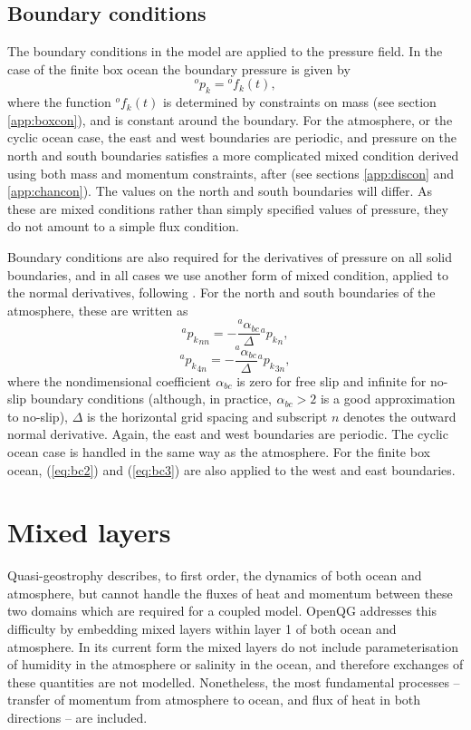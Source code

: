 \documentclass[11pt, a4paper,twoside]{article}
\newcommand{\p}[2]{{{}^{#1}p_{#2}}}
\newcommand{\f}[2]{{{}^{#1}f_{#2}}}
\newcommand{\alphbc}[1]{{}^{#1}\alpha_{bc}}
\numberwithin{equation}{section}
\begin{document}
\subsection{Boundary conditions}
The boundary conditions in the model are applied to the pressure field.
In the case of the finite box ocean the boundary pressure is given by
\begin{equation}\label{eq:bc1}
\p{o}{k} = \f{o}{k}(t),
\end{equation}
where the function $\f{o}{k}(t)$ is determined by constraints on mass
(see section \ref{app:boxcon}), and is constant around the boundary. 
For the atmosphere, or the cyclic ocean case, the east and west
boundaries are periodic, and pressure on the north and south boundaries
satisfies a more complicated mixed condition derived using
both mass and momentum constraints, after \citet{mcwilliams:77}
(see sections \ref{app:discon} and \ref{app:chancon}). 
The values on the north and south boundaries will differ. 
As these are mixed conditions rather than simply specified values of pressure, they do not amount to a simple flux condition.

Boundary conditions are also required for the derivatives of pressure on all solid boundaries, and in all cases we use another form of mixed condition, applied to the normal derivatives, following \citet{haidvogel:92}.
For the north and south boundaries of the atmosphere, these are written as
\begin{equation}\label{eq:bc2}
\p{a}{k}_{nn} = -  \frac{\alphbc{a}}{\Delta} \p{a}{k}_n,
\end{equation}
\begin{equation}\label{eq:bc3}
\p{a}{k}_{4n} = - \frac{\alphbc{a}}{\Delta} \p{a}{k}_{3n},
\end{equation}
where the nondimensional coefficient $\alphbc{}$ is zero for free slip and infinite for no-slip boundary conditions (although, in practice, $\alphbc{}>2$ is a good approximation to no-slip), $\Delta$ is the horizontal grid spacing and subscript $n$ denotes the outward normal derivative.
Again, the east and west boundaries are periodic. 
The cyclic ocean case is handled in the same way as the atmosphere. For the finite box ocean, (\ref{eq:bc2}) and (\ref{eq:bc3}) are also applied to the west and east boundaries.

\section{Mixed layers}\label{sec:mixed}
Quasi-geostrophy describes, to first order, the dynamics of both ocean and atmosphere, but cannot handle the fluxes of heat and momentum between these two domains which are required for a coupled model.
OpenQG addresses this difficulty by embedding mixed layers within layer 1 of both ocean and atmosphere.
In its current form the mixed layers do not include parameterisation of humidity in the atmosphere or salinity in the ocean, and therefore exchanges of these quantities are not modelled.
Nonetheless, the most fundamental processes -- transfer of momentum from atmosphere to ocean, and flux of heat in both directions -- are included.
\end{document}
